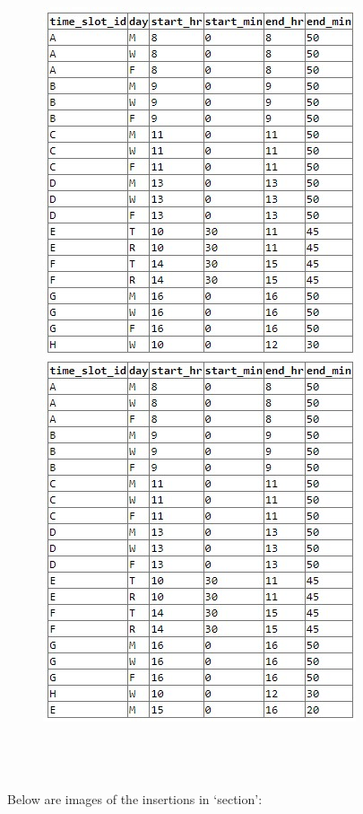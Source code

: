 \documentclass{article}
\begin{document}
\begin{figure}[!hbt]
    \centering
    \includegraphics[scale=0.82]{pics/insert-pic4.jpg}
    \label{fig:ins4}
\end{figure} \\ \\ \\
Below are images of the insertions in `section':
\end{document}
